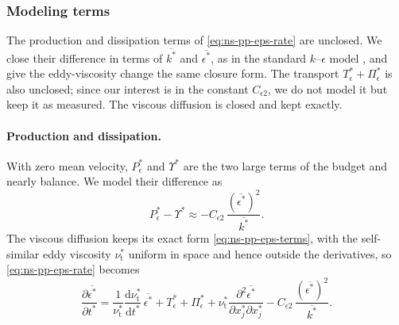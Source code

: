 \documentclass{article}
\begin{document}
\subsubsection{Modeling terms}\label{sssec:ns-pp-eps-model}
The production and dissipation terms of \eqref{eq:ns-pp-eps-rate} are
unclosed. We close their difference in terms of $\overline{k^*}$ and
$\overline{\epsilon^*}$, as in the standard $k$--$\epsilon$ model
\cite{pope2000turbulent}, and give the eddy-viscosity change the same closure
form. The transport $T_\epsilon^* + \Pi_\epsilon^*$ is also unclosed; since
our interest is in the constant $C_{\epsilon 2}$, we do not model it but keep
it as measured. The viscous diffusion is closed and kept exactly.

\paragraph{Production and dissipation.}
With zero mean velocity, $P_\epsilon^*$ and $\Upsilon^*$ are the two large
terms of the budget and nearly balance. We model their difference as
\begin{equation}\label{eq:ns-pp-eps-model-PY}
  P_\epsilon^* - \Upsilon^*
  \approx -C_{\epsilon 2}\, \frac{\left(\overline{\epsilon^*}\right)^2}{\overline{k^*}} .
\end{equation}
The viscous diffusion keeps its exact form \eqref{eq:ns-pp-eps-terms}, with
the self-similar eddy viscosity $\nu_{\mathrm{t}}^*$ uniform in space and hence
outside the derivatives, so \eqref{eq:ns-pp-eps-rate} becomes
\begin{equation}\label{eq:ns-pp-eps-model-dim}
  \frac{\partial \overline{\epsilon^*}}{\partial t^*}
  = \frac{1}{\nu_{\mathrm{t}}^*}\frac{\mathrm{d}\nu_{\mathrm{t}}^*}{\mathrm{d}t^*}\, \overline{\epsilon^*}
  + T_\epsilon^* + \Pi_\epsilon^*
  + \nu_{\mathrm{t}}^* \frac{\partial^2 \overline{\epsilon^*}}{\partial x_j^* \partial x_j^*}
  - C_{\epsilon 2}\, \frac{\left(\overline{\epsilon^*}\right)^2}{\overline{k^*}} .
\end{equation}
\end{document}
